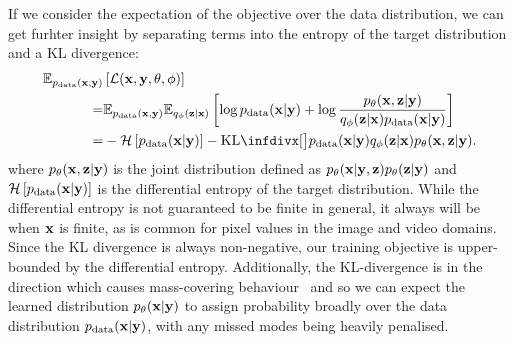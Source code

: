 If we consider the expectation of the objective over the data distribution, we can get furhter insight by separating terms into the entropy of the target distribution and a KL divergence:
\begin{align}
  \EX_{\pdata(\rvx,\rvy)} &\left[ \mathcal{L}(\rvx, \rvy, \theta, \phi) \right] \\
  =& \EX_{\pdata(\rvx,\rvy)} \EX_{q_\phi(\rvz|\rvx)} \left[ \log \pdata(\rvx|\rvy) + \log \frac{p_\theta(\rvx,\rvz|\rvy)}{q_\phi(\rvz|\rvx)\pdata(\rvx|\rvy)} \right]\\
    =& -\mathcal{H}\left[ \pdata(\rvx|\rvy) \right] - \kl[\big] { \pdata(\rvx|\rvy) q_\phi(\rvz|\rvx) }{ p_\theta(\rvx,\rvz|\rvy) }. \label{eq:elbo-kl-joints}
\end{align}
where $p_\theta({\mathbf{x}},{\mathbf{z}}|{\mathbf{y}})$ is the joint distribution defined as $p_\theta({\mathbf{x}}|{\mathbf{y}},{\mathbf{z}})p_\theta({\mathbf{z}}|{\mathbf{y}})$ and $\mathcal{H}\left[ p_{\rm{data}}({\mathbf{x}}|{\mathbf{y}}) \right]$ is the differential entropy of the target distribution. While the differential entropy is not guaranteed to be finite in general, it always will be when ${\mathbf{x}}$ is finite, as is common for pixel values in the image and video domains. Since the KL divergence is always non-negative, our training objective is upper-bounded by the differential entropy. Additionally, the KL-divergence is in the direction which causes mass-covering behaviour~\citep{bishop2006pattern} and so we can expect the learned distribution $p_\theta({\mathbf{x}}|{\mathbf{y}})$ to assign probability broadly over the data distribution $p_{\rm{data}}({\mathbf{x}}|{\mathbf{y}})$, with any missed modes being heavily penalised.

